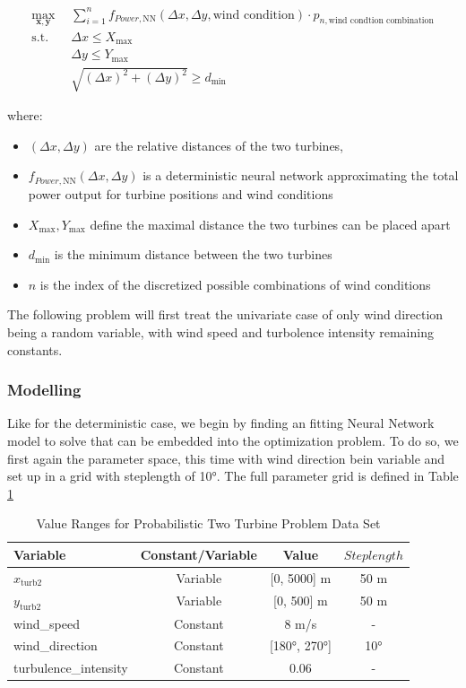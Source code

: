 \begin{align}
	\max_{\mathbf{x}, \mathbf{y}} &  \sum_{i=1}^{n} f_{Power,\text{NN}}(\Delta x, \Delta y, \text{wind condition})\cdot p_{n,\text{wind condtion combination}} \\
	\text{s.t.} \quad 
	&  \Delta x \leq X_{\max} \\
	&  \Delta y \leq Y_{\max} \\
	& \sqrt{(\Delta x)^2 + (\Delta y)^2} \geq d_{\min}
\end{align}

where:
\begin{itemize}
	\item \( (\Delta x, \Delta y) \) are the relative distances of the two turbines,
	\item \( f_{Power, \text{NN}}(\Delta x, \Delta y)\) is a deterministic neural network  approximating the total power output for turbine positions and wind conditions
	\item \(  X_{\max}, Y_{\max} \) define the maximal distance the two turbines can be placed apart
	\item \( d_{\min} \) is the minimum distance between the two turbines
	\item \( n \) is the index of the discretized possible combinations of wind conditions 
\end{itemize}

The following problem will first treat the univariate case of only wind direction being a random variable, with wind speed and turbolence intensity remaining constants. 

\subsubsection{Modelling}

Like for the deterministic case, we begin by finding an fitting Neural Network model to solve that can be embedded into the optimization problem. To do so, we  first again the parameter space, this time with wind direction bein variable and set up in a grid with steplength of 10°. The full parameter grid is defined in Table \ref{tab:val_prob_data}

\begin{table}[ht]
	\centering
	\caption{Value Ranges for Probabilistic Two Turbine Problem Data Set}
	\begin{tabular}{|l|c|c|c|}
		\hline
		\textbf{Variable} & \textbf{Constant/Variable} & \textbf{Value} & \textbf{$Steplength$}\\
		\hline
		$x_{\text{turb2}}$ & Variable & [0, 5000] m & 50 m\\
		$y_{\text{turb2}}$ & Variable & [0, 500] m  & 50 m\\
		wind\_speed & Constant & 8 m/s & -\\
		wind\_direction & Constant & [180°, 270°]& 10° \\
		turbulence\_intensity & Constant & 0.06 & - \\
		\hline
	\end{tabular}
	\label{tab:val_prob_data}
\end{table}

